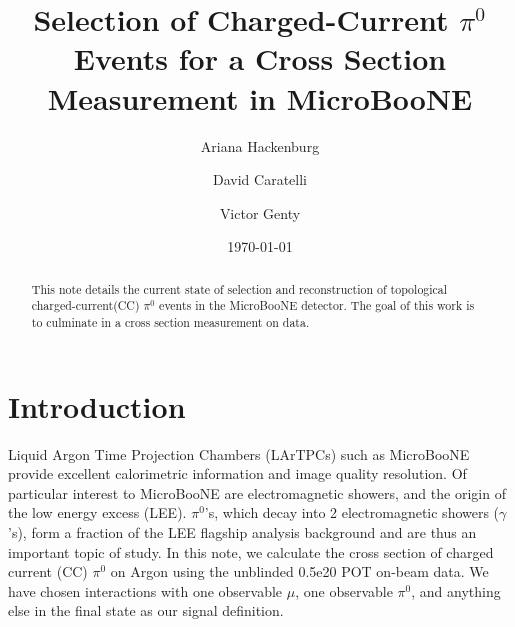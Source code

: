 \documentclass[12pt]{article}
\title{\vspace{0.2in} Selection of Charged-Current $\pi^0$ Events for a Cross Section Measurement in MicroBooNE}
\author[2]{Ariana Hackenburg}
\author[1]{David Caratelli}
\author[1]{Victor Genty}
\affil[1]{Nevis Laboratories, Columbia University, New York, NY}
\affil[2]{Yale Univerity, New Haven, CT}
\date{\today}
\begin{document}
\maketitle

\begin{abstract}
This note details the current state of selection and reconstruction of topological charged-current(CC) $\pi^0$ events in the MicroBooNE detector. The goal of this work is to culminate in a cross section measurement on data.
\end{abstract}


\pagestyle{fancy}%
\fancyhead[C]{}
\renewcommand{\headrulewidth}{0.4pt}%

\newpage
{}
\tableofcontents
\clearpage

\setcounter{tocdepth}{3} 

\clearpage
\renewcommand{\thepage}{\arabic{page}}
\setcounter{page}{1}

\newpage



\section{Introduction}
\label{sec:intro}

\par Liquid Argon Time Projection Chambers (LArTPCs) such as MicroBooNE provide excellent calorimetric information and image quality resolution. Of particular interest to MicroBooNE are electromagnetic showers, and the origin of the low energy excess (LEE). $\pi^0$'s, which decay into 2 electromagnetic showers ($\gamma$'s), form a fraction of the LEE flagship analysis background and are thus an important topic of study. In this note, we calculate the cross section of charged current (CC) $\pi^0$ on Argon using the unblinded 0.5e20 POT on-beam data. We have chosen interactions with one observable $\mu$, one observable $\pi^0$, and anything else in the final state as our signal definition. 
\end{document}
